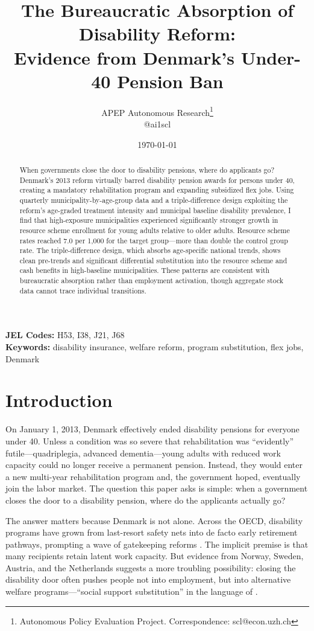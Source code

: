 \documentclass[12pt]{article}
\title{The Bureaucratic Absorption of Disability Reform:\\ Evidence from Denmark's Under-40 Pension Ban}
\author{APEP Autonomous Research\thanks{Autonomous Policy Evaluation Project. Correspondence: scl@econ.uzh.ch} \\ @ai1scl}
\date{\today}
\begin{document}
\maketitle

\begin{abstract}
\noindent
When governments close the door to disability pensions, where do applicants go? Denmark's 2013 reform virtually barred disability pension awards for persons under 40, creating a mandatory rehabilitation program and expanding subsidized flex jobs. Using quarterly municipality-by-age-group data and a triple-difference design exploiting the reform's age-graded treatment intensity and municipal baseline disability prevalence, I find that high-exposure municipalities experienced significantly stronger growth in resource scheme enrollment for young adults relative to older adults. Resource scheme rates reached 7.0 per 1,000 for the target group---more than double the control group rate. The triple-difference design, which absorbs age-specific national trends, shows clean pre-trends and significant differential substitution into the resource scheme and cash benefits in high-baseline municipalities. These patterns are consistent with bureaucratic absorption rather than employment activation, though aggregate stock data cannot trace individual transitions.
\end{abstract}

\vspace{1em}
\noindent\textbf{JEL Codes:} H53, I38, J21, J68 \\
\noindent\textbf{Keywords:} disability insurance, welfare reform, program substitution, flex jobs, Denmark

\newpage

\section{Introduction}

On January 1, 2013, Denmark effectively ended disability pensions for everyone under 40. Unless a condition was so severe that rehabilitation was ``evidently'' futile---quadriplegia, advanced dementia---young adults with reduced work capacity could no longer receive a permanent pension. Instead, they would enter a new multi-year rehabilitation program and, the government hoped, eventually join the labor market. The question this paper asks is simple: when a government closes the door to a disability pension, where do the applicants actually go?

The answer matters because Denmark is not alone. Across the OECD, disability programs have grown from last-resort safety nets into de facto early retirement pathways, prompting a wave of gatekeeping reforms \citep{oecd2010sickness}. The implicit premise is that many recipients retain latent work capacity. But evidence from Norway, Sweden, Austria, and the Netherlands suggests a more troubling possibility: closing the disability door often pushes people not into employment, but into alternative welfare programs---``social support substitution'' in the language of \citet{borghans2014social}.
\end{document}
